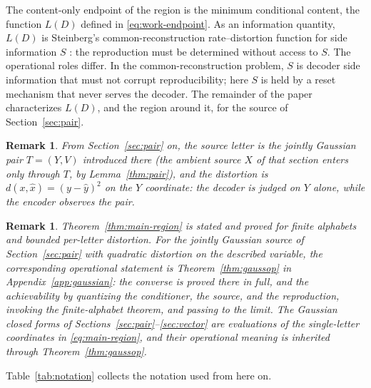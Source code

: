 \documentclass[11pt,onecolumn]{IEEEtran}
\newtheorem{remark}[theorem]{Remark}
\begin{document}
The content-only endpoint of the region is the minimum conditional content, the
function $L(D)$ defined in \eqref{eq:work-endpoint}.
As an information quantity, $L(D)$ is Steinberg's common-reconstruction
rate--distortion function for side information $S$ \cite{steinberg2009}: the
reproduction must be determined without access to $S$. The operational roles
differ. In the common-reconstruction problem, $S$ is decoder side information
that must not corrupt reproducibility; here $S$ is held by a reset mechanism
that never serves the decoder. The remainder of the paper characterizes
$L(D)$, and the region around it, for the source of Section~\ref{sec:pair}.

\begin{remark}\label{rem:specialization}
From Section~\ref{sec:pair} on, the source letter is the jointly Gaussian
pair $T=(Y,V)$ introduced there (the ambient source $X$ of that section
enters only through $T$, by Lemma~\ref{thm:pair}), and the distortion is
$d(x,\hat x)=(y-\hat y)^2$ on the $Y$ coordinate: the decoder is judged on
$Y$ alone, while the encoder observes the pair.
\end{remark}

\begin{remark}\label{rem:scope}
Theorem~\ref{thm:main-region} is stated and proved for finite alphabets and
bounded per-letter distortion. For the jointly Gaussian source of
Section~\ref{sec:pair} with quadratic distortion on the described
variable, the corresponding operational statement is
Theorem~\ref{thm:gaussop} in Appendix~\ref{app:gaussian}: the converse
is proved there in full, and the achievability by quantizing the conditioner, the source, and the
reproduction, invoking the finite-alphabet theorem, and passing to the
limit. The Gaussian closed forms of
Sections~\ref{sec:pair}--\ref{sec:vector} are evaluations of the
single-letter coordinates in \eqref{eq:main-region}, and their
operational meaning is inherited through Theorem~\ref{thm:gaussop}.
\end{remark}

Table~\ref{tab:notation} collects the notation used from here on.
\end{document}
